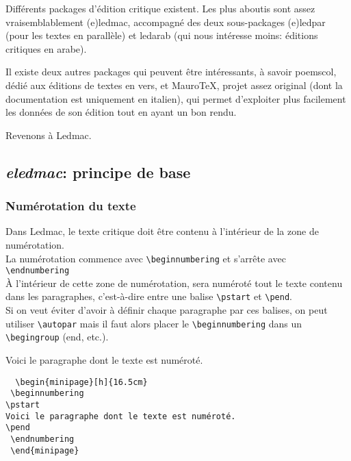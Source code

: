 \documentclass[a4paper,twoside,french,12pt]{book}
\begin{document}
Différents packages d'édition critique existent. Les plus aboutis sont assez vraisemblablement (e)ledmac, accompagné des deux sous-packages (e)ledpar (pour les textes en parallèle) et ledarab (qui nous intéresse moins: éditions critiques en arabe).

Il existe deux autres packages qui peuvent être intéressants, à savoir poemscol, dédié aux éditions de textes en vers, et MauroTeX, projet assez original (dont la documentation est uniquement en italien), qui permet d'exploiter plus facilement les données de son édition tout en ayant un bon rendu.

Revenons à Ledmac.

\subsection{\textit{eledmac}: principe de base}

\subsubsection{Numérotation du texte}



Dans Ledmac, le texte critique doit être contenu à l'intérieur de la zone de numérotation.\\
La numérotation commence avec \verb=\beginnumbering= et s'arrête avec \verb=\endnumbering=\\
À l'intérieur de cette zone de numérotation, sera numéroté tout le texte contenu dans les paragraphes, c'est-à-dire entre une balise \verb=\pstart= et \verb=\pend=.\\
{ \footnotesize
Si on veut éviter d'avoir à définir chaque paragraphe par ces balises, on peut utiliser \verb=\autopar= mais il faut alors placer le \verb=\beginnumbering= dans un \verb=\begingroup= (end, etc.).}

 \begin{minipage}[h]{16.5cm}
 \beginnumbering
\pstart
Voici le paragraphe dont le texte est numéroté.
\pend
 \endnumbering
 \end{minipage}
 
 \begin{verbatim}
  \begin{minipage}[h]{16.5cm}
 \beginnumbering
\pstart
Voici le paragraphe dont le texte est numéroté.
\pend
 \endnumbering
 \end{minipage}
 \end{verbatim}
  
\end{document}
